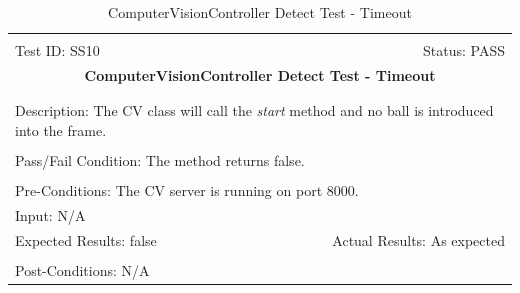 \documentclass[11pt]{article}
\begin{document}
\begin{center}
\begin{table}[H]
\begin{tabular}{|l r|}\hline&\\[-2mm]
	Test ID: SS10	&Status: PASS\\[-3mm]
	\multicolumn{2}{|c|}{\textbf{\large{ComputerVisionController Detect Test - Timeout}}}\\&\\\hline&\\[-3mm]
	\multicolumn{2}{|p{\textwidth}|}{Description: The CV class will call the \textit{start} method and no ball is introduced into the frame.}\\[1mm]\hline&\\[-3mm]
	\multicolumn{2}{|p{\textwidth}|}{Pass/Fail Condition: The method returns false.}\\[1mm]\hline&\\[-3mm]
	\multicolumn{2}{|p{\textwidth}|}{Pre-Conditions: The CV server is running on port 8000.}\\[4mm]
	\multicolumn{2}{|p{\textwidth}|}{Input: N/A}\\[2mm]\hline
	\multicolumn{1}{|p{0.49\textwidth}}{Expected Results: false}	&\multicolumn{1}{|p{0.45\textwidth}|}{Actual Results: As expected}\\\hline&\\[-3mm]
	\multicolumn{2}{|p{\textwidth}|}{Post-Conditions: N/A}\\\hline
\end{tabular}
\caption{ComputerVisionController Detect Test - Timeout}
\end{table}
\end{center}
\end{document}
